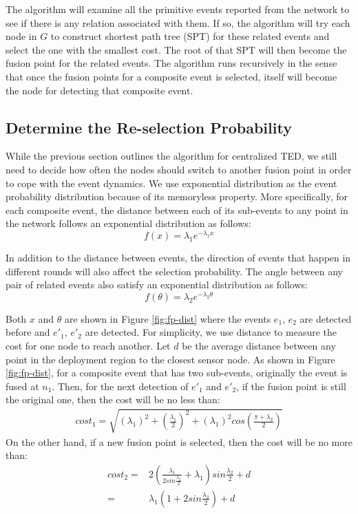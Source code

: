 The algorithm will examine all the primitive events reported from the network to see if there is any relation associated with them. If so, the algorithm will try each node in \(G\) to construct shortest path tree (SPT) for these related events and select the one with the smallest cost. The root of that SPT will then become the fusion point for the related events. The algorithm runs recursively in the sense that once the fusion points for a composite event is selected, itself will become the node for detecting that composite event.

\subsection{Determine the Re-selection Probability}
While the previous section outlines the algorithm for centralized TED, we still need to decide how often the nodes should switch to another fusion point in order to cope with the event dynamics. We use exponential distribution as the event probability distribution because of its memoryless property. More specifically, for each composite event, the distance between each of its sub-events to any point in the network follows an exponential distribution as follows:
\begin{displaymath}
f(x)={\lambda}_1e^{-{\lambda}_1x}
\end{displaymath}

In addition to the distance between events, the direction of events that happen in different rounds will also affect the selection probability. The angle between any pair of related events also satisfy an exponential distribution as follows:
\begin{displaymath}
f(\theta)={\lambda}_2e^{-{\lambda}_2\theta}
\end{displaymath}

Both \(x\) and \(\theta\) are shown in Figure \ref{fig:fp-dist} where the events \(e_1\), \(e_2\) are detected before and \(e'_1\), \(e'_2\) are detected. For simplicity, we use distance to measure the cost for one node to reach another. Let \(d\) be the average distance between any point in the deployment region to the closest sensor node. As shown in Figure \ref{fig:fp-dist}, for a composite event that has two sub-events, originally the event is fused at \(n_1\). Then, for the next detection of \(e'_1\) and \(e'_2\), if the fusion point is still the original one, then the cost will be no less than:
\begin{align*}
cost_1=\sqrt{({\lambda}_1)^2+(\frac{{\lambda}_1}{2})^2+({\lambda}_1)^2cos(\frac{\pi+{\lambda}_2}{2})}
\end{align*}
On the other hand, if a new fusion point is selected, then the cost will be no more than:
\begin{align*}
cost_2=&2(\frac{{\lambda}_1}{2sin\frac{{\lambda}_2}{2}}+{\lambda}_1)sin\frac{{\lambda}_2}{2}+d\\
=&{\lambda}_1(1+2sin\frac{{\lambda}_2}{2})+d
\end{align*}

